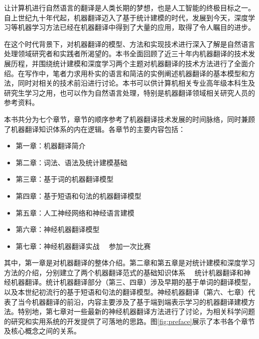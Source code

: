 \begin{spacing}{1.18}

让计算机进行自然语言的翻译是人类长期的梦想，也是人工智能的终极目标之一。自上世纪九十年代起，机器翻译迈入了基于统计建模的时代，发展到今天，深度学习等机器学习方法已经在机器翻译中得到了大量的应用，取得了令人瞩目的进步。

在这个时代背景下，对机器翻译的模型、方法和实现技术进行深入了解是自然语言处理领域研究者和实践者所渴望的。本书全面回顾了近三十年内机器翻译的技术发展历程，并围绕统计建模和深度学习两个主题对机器翻译的技术方法进行了全面介绍。在写作中，笔者力求用朴实的语言和简洁的实例阐述机器翻译的基本模型和方法，同时对相关的技术前沿进行讨论。本书可以供计算机相关专业高年级本科生及研究生学习之用，也可以作为自然语言处理，特别是机器翻译领域相关研究人员的参考资料。

本书共分为七个章节，章节的顺序参考了机器翻译技术发展的时间脉络，同时兼顾了机器翻译知识体系的内在逻辑。各章节的主要内容包括：

\begin{itemize}
\vspace{0.5em}
\item 第一章：机器翻译简介
\vspace{0.5em}
\item 第二章：词法、语法及统计建模基础
\vspace{0.5em}
\item 第三章：基于词的机器翻译模型
\vspace{0.5em}
\item 第四章：基于短语和句法的机器翻译模型
\vspace{0.5em}
\item 第五章：人工神经网络和神经语言建模
\vspace{0.5em}
\item 第六章：神经机器翻译模型
\vspace{0.5em}
\item 第七章：神经机器翻译实战 \ \dash \ 参加一次比赛
\vspace{0.5em}
\end{itemize}

其中，第一章是对机器翻译的整体介绍。第二章和第五章是对统计建模和深度学习方法的介绍，分别建立了两个机器翻译范式的基础知识体系 \ \dash \ 统计机器翻译和神经机器翻译。统计机器翻译部分（第三、四章）涉及早期的基于单词的翻译模型，以及本世纪初流行的基于短语和句法的翻译模型。神经机器翻译（第六、七章）代表了当今机器翻译的前沿，内容主要涉及了基于端到端表示学习的机器翻译建模方法。特别地，第七章对一些最新的神经机器翻译方法进行了讨论，为相关科学问题的研究和实用系统的开发提供了可落地的思路。图\ref{fig:preface}展示了本书各个章节及核心概念之间的关系。


\end{spacing}
